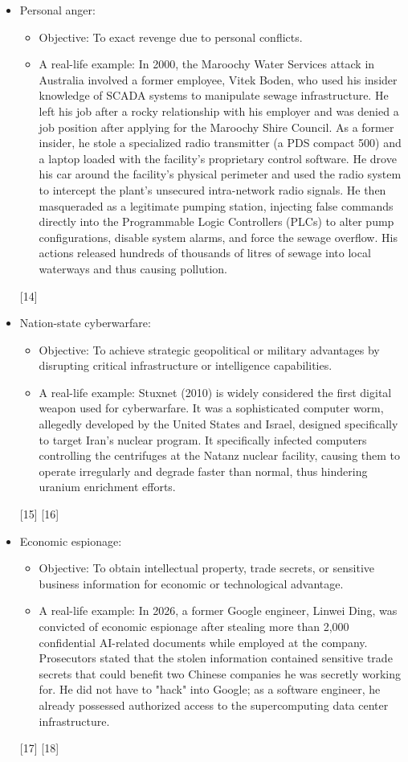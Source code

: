 \begin{itemize}
  \item Personal anger:
  \begin{itemize}
    \item Objective: To exact revenge due to personal conflicts.
    \item A real-life example: In 2000, the Maroochy Water Services attack in Australia involved a former employee, Vitek Boden, who used his insider knowledge of SCADA systems to manipulate sewage infrastructure. He left his job after a rocky relationship with his employer and was denied a job position after applying for the Maroochy Shire Council. As a former insider, he stole a specialized radio transmitter (a PDS compact 500) and a laptop loaded with the facility's proprietary control software. He drove his car around the facility's physical perimeter and used the radio system to intercept the plant's unsecured intra-network radio signals. He then masqueraded as a legitimate pumping station, injecting false commands directly into the Programmable Logic Controllers (PLCs) to alter pump configurations, disable system alarms, and force the sewage overflow. His actions released hundreds of thousands of litres of sewage into local waterways and thus causing pollution.
  \end{itemize}
  [14]

  \item Nation-state cyberwarfare:
  \begin{itemize}
    \item Objective: To achieve strategic geopolitical or military advantages by disrupting critical infrastructure or intelligence capabilities.
    \item A real-life example: Stuxnet (2010) is widely considered the first digital weapon used for cyberwarfare. It was a sophisticated computer worm, allegedly developed by the United States and Israel, designed specifically to target Iran's nuclear program. It specifically infected computers controlling the centrifuges at the Natanz nuclear facility, causing them to operate irregularly and degrade faster than normal, thus hindering uranium enrichment efforts.
  \end{itemize}
  [15] [16]

  \item Economic espionage:
  \begin{itemize}
    \item Objective: To obtain intellectual property, trade secrets, or sensitive business information for economic or technological advantage.
    \item A real-life example: In 2026, a former Google engineer, Linwei Ding, was convicted of economic espionage after stealing more than 2,000 confidential AI-related documents while employed at the company. Prosecutors stated that the stolen information contained sensitive trade secrets that could benefit two Chinese companies he was secretly working for. He did not have to "hack" into Google; as a software engineer, he already possessed authorized access to the supercomputing data center infrastructure.
  \end{itemize}
  [17] [18]
\end{itemize}

